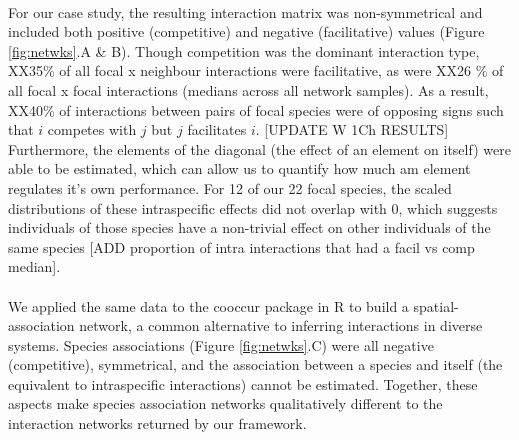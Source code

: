 \documentclass[a4,12pt]{article}
\begin{document}
  


    \paragraph{}
     For our case study, the resulting interaction matrix was non-symmetrical and included both positive (competitive) and negative (facilitative) values (Figure \ref{fig:netwks}.A \& B). Though competition was the dominant interaction type,  XX35\% of all focal x neighbour interactions were facilitative, as were XX26 \% of all focal x focal interactions (medians across all network samples). As a result, XX40\% of interactions between pairs of focal species were of opposing signs such that $i$ competes with $j$ but $j$ facilitates $i$. [UPDATE W 1Ch RESULTS]
     Furthermore, the elements of the diagonal (the effect of an element on itself) were able to be estimated, which can allow us to quantify how much am element regulates it's own performance. For 12 of our 22 focal species, the scaled distributions of these intraspecific effects did not overlap with 0, which suggests individuals of those species have a non-trivial effect on other individuals of the same species [ADD proportion of intra interactions that had a facil vs comp median]. 


     \paragraph{}
     We applied the same data to the cooccur package in R \parencite{Griffith2016} to build a spatial-association network, a common alternative to inferring interactions in diverse systems. Species associations (Figure \ref{fig:netwks}.C) were all negative (competitive), symmetrical, and the association between a species and itself (the equivalent to intraspecific interactions) cannot be estimated. Together, these aspects make species association networks qualitatively different to the interaction networks returned by our framework. 
\end{document}
